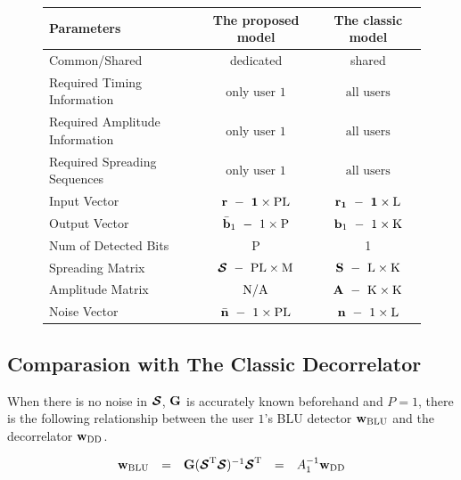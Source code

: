 \documentclass[a4paper,10pt,fleqn, twocolumn]{IEEETran}
\newcommand{\bb}{{\bf b}}
\newcommand{\bG}{{\bf G}}
\newcommand{\bn}{{\bf n}}
\newcommand{\bw}{{\bf w}}
\newcommand{\bS}{{\bf S}}
\newcommand{\bcS}{{\mbox {\boldmath ${\cal S}$}}}
\begin{document}
\begin{figure}[t]\label{ModelComp}
\begin{center}
\center{}
\begin{tabular}{lcc}
Parameters&The proposed model&The classic model\\
\hline
Common/Shared& dedicated& shared\\
Required Timing Information&$\mbox{only user 1}$ & $\mbox{all users}$\\
Required Amplitude Information&$\mbox{only user 1}$ & $\mbox{all users}$\\
Required Spreading Sequences&$\mbox{only user 1}$ & $\mbox{all users}$\\
 \hline
Input Vector&$\bf{r}\ -\ 1\times\rm PL$&$\bf{r}_1\ -\ 1\times\rm L$\\
Output Vector &$\bar\bb_1\ -\ 1\times\rm P$&$\bb_1\ -\ 1\times\rm K$\\
Num of Detected Bits& P & 1\\
Spreading Matrix &$\bcS\ -\ \rm PL\times\rm M$&$\bS\ -\ \rm L\times\rm K$\\
Amplitude Matrix &$\rm N/A$&$\bf{A}\ -\ \rm K\times\rm K$\\
Noise Vector &$\bar\bn\ -\ 1\times\rm PL$&$\bn\ -\
1\times\rm L$\\

 \hline
\end{tabular}
\end{center}
\end{figure}

\subsection{Comparasion with The Classic Decorrelator}

When there is no noise in $\bcS$, $\bG$ is accurately known
beforehand and $P=1$, there is the following relationship between
the user $1$'s BLU detector $\bw_{\rm BLU}$ and the decorrelator
$\bw_{\rm DD}$.

\begin{equation}
\begin{array}{rcccl}
\bw_{\rm BLU}&=&\bG(\bcS^{\rm T}\bcS)^{-1}\bcS^{\rm
T}&=&A_1^{-1}\bw_{\rm DD}
\end{array}
\end{equation} \label{wN0}
\end{document}
